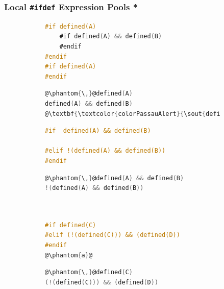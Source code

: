 \documentclass{beamer}
\newcommand\code[1]{\texttt{#1}}
\newcommand\ifdeff[1]{\code{\##1}\xspace}
\newcommand\ifdef[0]{{\upshape\ifdeff{ifdef}}\xspace}
\begin{document}
\begin{frame}[fragile]
\frametitle{Local \ifdef Expression Pools \textcolor{colorPassauAlert}{*}}



\begin{figure}[ht]
        \centering
        \small
        \begin{subfigure}[c]{0.52\textwidth}
					\begin{lstlisting}[language=C]
#if defined(A)
	#if defined(A) && defined(B)
	#endif
#endif
#if defined(A)
#endif
					\end{lstlisting}
				\end{subfigure}
				\hfill
        \begin{subfigure}[c]{0.43\textwidth}
					\begin{lstlisting}[language=C]
@\phantom{\,}@defined(A)
defined(A) && defined(B)
@\textbf{\textcolor{colorPassauAlert}{\sout{defined(A)}}}@
					\end{lstlisting}					
				\end{subfigure}	
\end{figure}%
\begin{figure}[ht]
        \centering
        \small
        \begin{subfigure}[c]{0.52\textwidth}
					\begin{lstlisting}[language=C, firstnumber=5]
#if  defined(A) && defined(B)

#elif !(defined(A) && defined(B))
#endif
					\end{lstlisting}
				\end{subfigure}
				\hfill
        \begin{subfigure}[c]{0.43\textwidth}
					\begin{lstlisting}[language=C]
@\phantom{\,}@defined(A) && defined(B)
!(defined(A) && defined(B))
					\end{lstlisting}					
				\end{subfigure}	
\end{figure}%
\begin{figure}[ht]
        \centering
        \small
        \begin{subfigure}[c]{0.52\textwidth}
					\begin{lstlisting}[language=C, firstnumber=8]


#if defined(C)
#elif (!(defined(C))) && (defined(D))
#endif
@\phantom{a}@
					\end{lstlisting}
				\end{subfigure}
				\hfill
        \begin{subfigure}[c]{0.43\textwidth}
					\begin{lstlisting}[language=C]
@\phantom{\,}@defined(C)
(!(defined(C))) && (defined(D))
					\end{lstlisting}					
				\end{subfigure}	
\end{figure}			


\end{frame}
\end{document}
